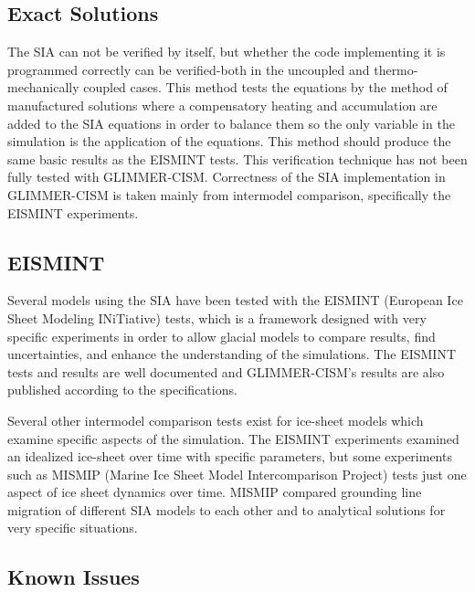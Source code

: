 
\subsection{Exact Solutions}

The SIA can not be verified by itself, but whether the code implementing it is programmed correctly can be verified-both in the uncoupled \citep{bueler:2005} and thermo-mechanically coupled cases.\citep{bueler:2007}  This method tests the equations by the method of manufactured solutions where a compensatory heating and accumulation are added to the SIA equations in order to balance them so the only variable in the simulation is the application of the equations.  This method should produce the same basic results as the EISMINT tests. This verification technique has not been fully tested with GLIMMER-CISM.  Correctness of the SIA implementation in GLIMMER-CISM is taken mainly from intermodel comparison, specifically the EISMINT experiments. 

\subsection{EISMINT}

Several models using the SIA have been tested with the EISMINT (European Ice Sheet Modeling INiTiative) tests, which is a framework designed with very specific experiments in order to allow glacial models to compare results, find uncertainties, and enhance the understanding of the simulations.  The EISMINT tests and results are well documented and GLIMMER-CISM's results are also published according to the specifications. \citep{Huybrechts:1996}\citep{glimmerdoc} 

Several other intermodel comparison tests exist for ice-sheet models which examine specific aspects of the simulation.  The EISMINT experiments examined an idealized ice-sheet over time with specific parameters, but some experiments such as MISMIP (Marine Ice Sheet Model Intercomparison Project) tests just one aspect of ice sheet dynamics over time.  MISMIP compared grounding line migration of different SIA models to each other and to analytical solutions for very specific situations. \cite{mismip4}



\subsection{Known Issues}

